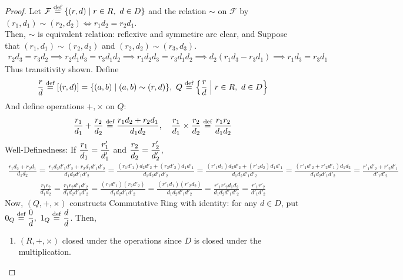 \begin{proof}
    Let $\mathcal{F} \overset{\textnormal{def}}{=} \{(r,d) \mid r \in R,\ d \in D\}$ and the relation $\sim$ on $\mathcal{F}$
    by $(r_1, d_1) \sim (r_2, d_2) \iff r_1d_2 = r_2d_1$.\\
    Then, $\sim$ is equivalent relation: reflexive and symmetirc are clear, and
    Suppose that $(r_1, d_1) \sim (r_2, d_2)$ and $(r_2, d_2) \sim (r_3, d_3)$.
    \begin{align*}
        r_2d_3 = r_3d_2 \implies r_2 d_1 d_3 = r_3 d_1 d_2 \implies r_1 d_2 d_3 = r_3 d_1 d_2 \implies d_2 ( r_1 d_3 - r_3 d_1) \implies r_1d_3 = r_3d_1
    \end{align*}
    Thus transitivity shown. Define
    \begin{align*}
        \frac{r}{d} \overset{\textnormal{def}}{=} [(r,d)] = \{(a,b) \mid (a,b) \sim (r,d) \},\ Q \overset{\textnormal{def}}{=} \left\{ \frac{r}{d} \;\middle|\; r \in R,\ d \in D \right\}
    \end{align*}
    And define operations $+, \times$ on $Q$:
    \begin{align*}
        \frac{r_1}{d_1} + \frac{r_2}{d_2} \overset{\textnormal{def}}{=} \frac{r_1d_2 + r_2d_1}{d_1 d_2}, \quad
        \frac{r_1}{d_1} \times \frac{r_2}{d_2} \overset{\textnormal{def}}{=} \frac{r_1r_2}{d_1d_2}
    \end{align*}
    Well-Definedness: If $\displaystyle \frac{r_1}{d_1} = \frac{r'_1}{d'_1}$ and $\displaystyle \frac{r_2}{d_2} = \frac{r'_2}{d'_2}$,
    \begin{align*}
        \frac{r_1d_2 + r_2d_1}{d_1 d_2}
        = \frac{r_1 d_2 d'_1 d'_2 + r_2 d_1 d'_1 d'_2}{d_1 d_2 d'_1 d'_2}
        = \frac{(r_1 d'_1) d_2 d'_2 + (r_2 d'_2) d_1 d'_1 }{d_1 d_2 d'_1 d'_2}
        = \frac{(r'_1 d_1) d_2 d'_2 + (r'_2 d_2) d_1 d'_1 }{d_1 d_2 d'_1 d'_2}
        = \frac{(r'_1d'_2 + r'_2d'_1)d_1d_2}{d_1d_2 d'_1 d'_2}
        = \frac{r'_1d'_2 + r'_2d'_1}{d'_1 d'_2}
    \end{align*}
    \begin{align*}
        \frac{r_1r_2}{d_1d_2} 
        = \frac{r_1 r_2 d'_1 d'_2}{d_1d_2d'_1d'_2}
        = \frac{(r_1 d'_1) (r_2 d'_2)}{d_1d_2d'_1d'_2}
        = \frac{(r'_1 d_1) (r'_2 d_2)}{d_1d_2d'_1d'_2}
        = \frac{r'_1 r'_2 d_1 d_2}{d_1d_2d'_1d'_2}
        = \frac{r'_1 r'_2}{d'_1d'_2}
    \end{align*}
    Now, $(Q, +, \times)$ constructs Commutative Ring with identity: for any $d \in D$, 
    put $\displaystyle 0_Q \overset{\textnormal{def}}{=} \frac{0}{d},\ 1_Q \overset{\textnormal{def}}{=} \frac{d}{d}$. Then,
    \begin{enumerate}
        \item $(R, +, \times)$ closed under the operations since $D$ is closed under the multiplication.

\end{enumerate}
\end{proof}
